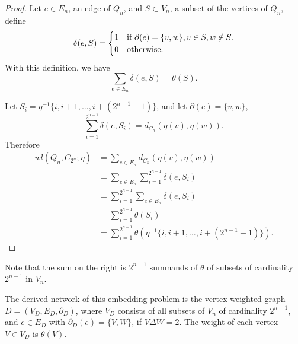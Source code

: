 \documentclass[12pt]{ucthesis}
\theoremstyle{plain}
\theoremstyle{definition}
\begin{document}
\begin{proof}
Let $e \in E_n$, an edge of $Q_n$,
and $S \subset V_n$, a subset of the vertices of $Q_n$, define
\begin{equation*}
\delta(e, S) = \begin{cases}
	1 & \textnormal{if } \partial(e) = \{v, w\}, v \in S, w \notin S. \\
	0 & \textnormal{otherwise}.
\end{cases}
\end{equation*}
With this definition, we have
\begin{equation*}
\sum_{e \in E_n} \delta(e, S) = \theta(S).
\end{equation*}

Let $S_i = \eta^{-1}\{i, i + 1, \dots, i + (2^{n - 1} - 1)\}$,
and let $\partial(e) = \{v, w\}$,
\begin{equation*}
\sum_{i = 1}^{2^{n - 1}} \delta(e, S_i) = d_{C_n}(\eta(v), \eta(w)).
\end{equation*}
Therefore
\begin{align*}
wl(Q_n, C_{2^n}; \eta)
& = \sum_{e \in E_n} d_{C_n}(\eta(v), \eta(w)) \\
& = \sum_{e \in E_n} \sum_{i = 1}^{2^{n - 1}} \delta(e, S_i) \\
& = \sum_{i = 1}^{2^{n - 1}} \sum_{e \in E_n} \delta(e, S_i) \\
& = \sum_{i = 1}^{2^{n - 1}} \theta(S_i) \\
& = \sum_{i = 1}^{2^{n - 1}} \theta(\eta^{-1}\{i, i + 1, \dots, i + (2^{n - 1} - 1)\}).
\end{align*}
\end{proof}

Note that the sum on the right is $2^{n - 1}$ summands of $\theta$ of subsets of
cardinality $2^{n - 1}$ in $V_n$.

The derived network of this embedding problem is the vertex-weighted graph $D = (V_D, E_D, \partial_D)$,
where $V_D$ consists of all subsets of $V_n$ of cardinality $2^{n - 1}$,
and $e \in E_D$ with $\partial_D(e) = \{V, W\}$, if $V \Delta W = 2$.
The weight of each vertex $V \in V_D$ is $\theta(V)$.
\end{document}

